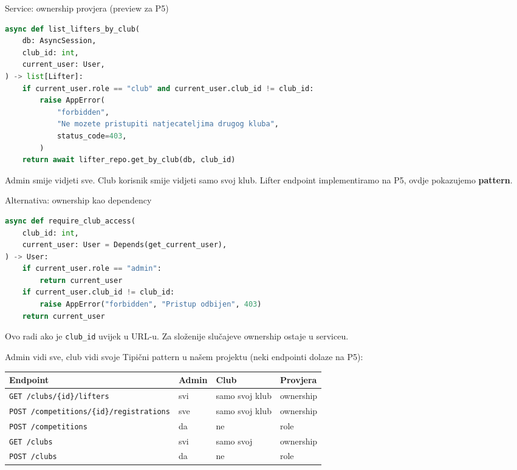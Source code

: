 \begin{frame}[fragile, shrink=10]{Service: ownership provjera (preview za P5)}
\begin{lstlisting}[language=python]
async def list_lifters_by_club(
    db: AsyncSession,
    club_id: int,
    current_user: User,
) -> list[Lifter]:
    if current_user.role == "club" and current_user.club_id != club_id:
        raise AppError(
            "forbidden",
            "Ne mozete pristupiti natjecateljima drugog kluba",
            status_code=403,
        )
    return await lifter_repo.get_by_club(db, club_id)
\end{lstlisting}

\vspace{0.4em}
Admin smije vidjeti sve. Club korisnik smije vidjeti samo svoj klub.
Lifter endpoint implementiramo na P5, ovdje pokazujemo \textbf{pattern}.
\end{frame}

\begin{frame}[fragile,shrink=5]{Alternativa: ownership kao dependency}
\begin{lstlisting}[language=python]
async def require_club_access(
    club_id: int,
    current_user: User = Depends(get_current_user),
) -> User:
    if current_user.role == "admin":
        return current_user
    if current_user.club_id != club_id:
        raise AppError("forbidden", "Pristup odbijen", 403)
    return current_user
\end{lstlisting}

\vspace{0.4em}
Ovo radi ako je \texttt{club\_id} uvijek u URL-u. Za složenije slučajeve ownership ostaje u serviceu.
\end{frame}

\begin{frame}{Admin vidi sve, club vidi svoje}
Tipični pattern u našem projektu (neki endpointi dolaze na P5):

\vspace{0.6em}
\begin{tabular}{@{}llll@{}}
  \toprule
  \textbf{Endpoint} & \textbf{Admin} & \textbf{Club} & \textbf{Provjera} \\
  \midrule
  \texttt{GET /clubs/\{id\}/lifters} & svi & samo svoj klub & ownership \\
  \texttt{POST /competitions/\{id\}/registrations} & sve & samo svoj klub & ownership \\
  \texttt{POST /competitions} & da & ne & role \\
  \texttt{GET /clubs} & svi & samo svoj & ownership \\
  \texttt{POST /clubs} & da & ne & role \\
  \bottomrule
\end{tabular}
\end{frame}

